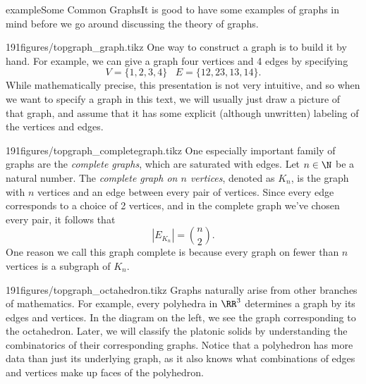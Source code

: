 \begin{framedpage}{example}{Some Common Graphs}{It is good to have some examples of graphs in mind before we go around discussing the theory of graphs.}

\begin{smallexamplefigureenv}[Graph:]{191figures/topgraph_graph.tikz}
One way to construct a graph is to build it by hand. 
For example, we can give a graph four vertices and 4 edges by specifying
  \[V=\{1,2,3,4\}\;\;\; E=\{12,23,13,14\}.\]
 While mathematically precise, this presentation is not very intuitive, and so when we want to specify a graph in this text, we will usually just draw a picture of that graph, and assume that it has some explicit (although unwritten) labeling of the vertices and edges.
\end{smallexamplefigureenv}


\begin{smallexamplefigureenv}{191figures/topgraph_completegraph.tikz}
  One especially important family of graphs are the \emph{complete graphs}, which are saturated with edges.
\noindent Let $n\in \N$ be a natural number. The \emph{complete graph on $n$ vertices},  denoted as $K_n$, is the graph with $n$ vertices and an edge between every pair of vertices. 
Since every edge corresponds to a choice of 2 vertices, and in the complete graph we've chosen every pair, it follows that 
\[|E_{K_n}|={n\choose 2}.\]
One reason we call this graph complete is because every graph on fewer than $n$ vertices is a subgraph of $K_n$. 
\end{smallexamplefigureenv}


\begin{smallexamplefigureenv}[Octahedron:]{191figures/topgraph_octahedron.tikz}
Graphs naturally arise from other branches of mathematics. 
For example, every polyhedra in $\RR^3$ determines a graph by its edges and vertices. In the diagram on the left, we see the graph corresponding to the octahedron.
Later, we will classify the platonic solids by understanding the combinatorics of their corresponding graphs. 
Notice that a polyhedron has more data than just its underlying graph, as it also knows what combinations of edges and vertices make up faces of the polyhedron. 
\end{smallexamplefigureenv}
\end{framedpage}